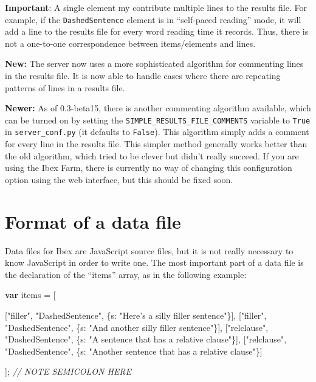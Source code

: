 \documentclass[]{article}
\newenvironment{Shaded}{}{}
\newcommand{\KeywordTok}[1]{\textcolor[rgb]{0.00,0.44,0.13}{\textbf{{#1}}}}
\newcommand{\DataTypeTok}[1]{\textcolor[rgb]{0.56,0.13,0.00}{{#1}}}
\newcommand{\StringTok}[1]{\textcolor[rgb]{0.25,0.44,0.63}{{#1}}}
\newcommand{\CommentTok}[1]{\textcolor[rgb]{0.38,0.63,0.69}{\textit{{#1}}}}
\newcommand{\NormalTok}[1]{{#1}}
\begin{document}
\textbf{Important}: A single element my contribute multiple lines to the
results file. For example, if the \texttt{DashedSentence} element is in
``self-paced reading'' mode, it will add a line to the results file for
every word reading time it records. Thus, there is not a one-to-one
correspondence between items/elements and lines.

\textbf{New:} The server now uses a more sophisticated algorithm for
commenting lines in the results file. It is now able to handle cases
where there are repeating patterns of lines in a results file.

\textbf{Newer:} As of 0.3-beta15, there is another commenting algorithm
available, which can be turned on by setting the
\texttt{SIMPLE\_RESULTS\_FILE\_COMMENTS} variable to \texttt{True} in
\texttt{server\_conf.py} (it defaults to \texttt{False}). This algorithm
simply adds a comment for every line in the results file. This simpler
method generally works better than the old algorithm, which tried to be
clever but didn't really succeed. If you are using the Ibex Farm, there
is currently no way of changing this configuration option using the web
interface, but this should be fixed soon.

\section{Format of a data file}\label{format-of-a-data-file}

Data files for Ibex are JavaScript source files, but it is not really
necessary to know JavaScript in order to write one. The most important
part of a data file is the declaration of the ``items'' array, as in the
following example:

\begin{Shaded}
\begin{Highlighting}[]
    \KeywordTok{var} \NormalTok{items = [}

    \NormalTok{[}\StringTok{"filler"}\NormalTok{, }\StringTok{"DashedSentence"}\NormalTok{, \{}\DataTypeTok{s}\NormalTok{: }\StringTok{"Here's a silly filler sentence"}\NormalTok{\}],}
    \NormalTok{[}\StringTok{"filler"}\NormalTok{, }\StringTok{"DashedSentence"}\NormalTok{, \{}\DataTypeTok{s}\NormalTok{: }\StringTok{"And another silly filler sentence"}\NormalTok{\}],}
    \NormalTok{[}\StringTok{"relclause"}\NormalTok{, }\StringTok{"DashedSentence"}\NormalTok{, \{}\DataTypeTok{s}\NormalTok{: }\StringTok{"A sentence that has a relative clause"}\NormalTok{\}],}
    \NormalTok{[}\StringTok{"relclause"}\NormalTok{, }\StringTok{"DashedSentence"}\NormalTok{, \{}\DataTypeTok{s}\NormalTok{: }\StringTok{"Another sentence that has a relative clause"}\NormalTok{\}]}

    \NormalTok{]; }\CommentTok{// NOTE SEMICOLON HERE}
\end{Highlighting}
\end{Shaded}
\end{document}
